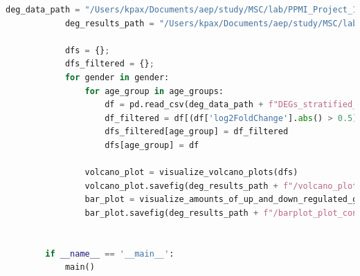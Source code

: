 \documentclass[12pt]{report}
\begin{document}
\begin{lstlisting}[language=Python,caption={process\_deg\_consolidated\_visits.py: Κατασκευή γραφημάτων διαφορικά εκφραζομένων γονιδίων}, label=lst:processdegconsolidatedvisitspy]
            deg_data_path = "/Users/kpax/Documents/aep/study/MSC/lab/PPMI_Project_133_RNASeq/data/deg_consolidated_visits/"
            deg_results_path = "/Users/kpax/Documents/aep/study/MSC/lab/PPMI_Project_133_RNASeq/data/deg_consolidated_visits/results"
        
            dfs = {};
            dfs_filtered = {};
            for gender in gender:
                for age_group in age_groups:
                    df = pd.read_csv(deg_data_path + f"DEGs_stratified_consoVisits_{gender}_{age_group}.csv")
                    df_filtered = df[(df['log2FoldChange'].abs() > 0.5) & (df['padj'] < 0.05)]
                    dfs_filtered[age_group] = df_filtered
                    dfs[age_group] = df
        
                volcano_plot = visualize_volcano_plots(dfs)
                volcano_plot.savefig(deg_results_path + f"/volcano_plot_consoVisits_{gender}.png")
                bar_plot = visualize_amounts_of_up_and_down_regulated_genes(dfs)
                bar_plot.savefig(deg_results_path + f"/barplot_plot_consoVisits_{gender}.png")
        
        
        if __name__ == '__main__':
            main()
        
    \end{lstlisting}
\end{document}
